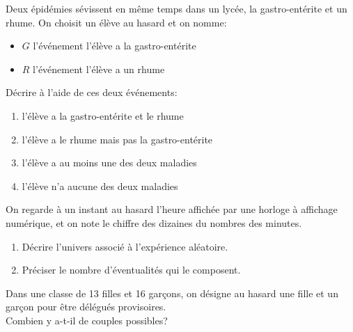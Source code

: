 \begin{exercice}
 Deux épidémies sévissent en même temps dans un lycée, la gastro-entérite et un rhume. On choisit un élève au hasard et on nomme:
 \begin{itemize}
 \item $G$ l'événement \og l'élève a la gastro-entérite\fg{}
 \item  $R$ l'événement \og l'élève a un rhume\fg 
\end{itemize} 
 Décrire à l'aide de ces deux événements: 
 \begin{enumerate}
  \item \og l'élève a la gastro-entérite et le rhume\fg 
  \item \og l'élève a le rhume mais pas la gastro-entérite\fg 
  \item \og l'élève a au moins une des deux maladies\fg 
  \item \og l'élève n'a aucune des deux maladies\fg 
 \end{enumerate}

\end{exercice}

\begin{exercice}\label{horloge numérique}
On regarde à un instant au hasard l'heure affichée par une 
horloge à affichage numérique, et on note le chiffre des dizaines du
nombres des
    minutes.
    \begin{enumerate}
    \item Décrire l'univers associé à l'expérience aléatoire.
    \item Préciser le nombre d'éventualités qui le composent.
    \end{enumerate}
\end{exercice}

\begin{exercice}
    Dans une classe de 13 filles et 16 garçons, on désigne au hasard une fille et un garçon pour être délégués
    provisoires.\\
    Combien y a-t-il de couples possibles?
\end{exercice}

